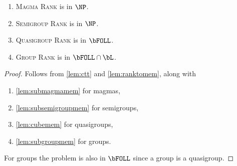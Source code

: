 
\begin{theorem}\label{thm:rank}
  \mbox{}
  \begin{enumerate}
  \item \textsc{Magma Rank} is in $\NP$.
  \item \textsc{Semigroup Rank} is in $\NP$.
  \item \textsc{Quasigroup Rank} is in $\bFOLL$.
  \item \textsc{Group Rank} is in $\bFOLL \cap \bL$.
  \end{enumerate}
\end{theorem}
\begin{proof}
  Follows from \autoref{lem:ctt} and \autoref{lem:ranktomem}, along with
  \begin{enumerate}
  \item \autoref{lem:submagmamem} for magmas,
  \item \autoref{lem:subsemigroupmem} for semigroups,
  \item \autoref{lem:cubemem} for quasigroups,
  \item \autoref{lem:subgroupmem} for groups.
  \end{enumerate}
  For groups the problem is also in $\bFOLL$ since a group is a quasigroup.
\end{proof}



